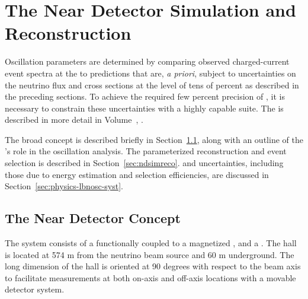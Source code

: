 \section{The Near Detector Simulation and Reconstruction}\label{sec:nu-osc-06}\label{sec:physics-lbnosc-ND}



Oscillation parameters are determined by comparing observed charged-current event spectra at the  to predictions that are, {\em a priori}, subject to uncertainties on the neutrino flux and cross sections at the level of tens of percent as described in the preceding sections. To achieve the required few percent precision of , it is necessary to constrain these uncertainties with a highly capable  suite. The  is described in more detail in Volume~\volnumberexec{}, \voltitleexec{}.

The broad  concept is described briefly in Section~\ref{sec:ndconcept}, along with an outline of the 's role in the oscillation analysis. The parameterized reconstruction and event selection is described in Section~\ref{sec:ndsimreco}. %
 and  uncertainties, including those due to energy estimation and selection efficiencies, are discussed in Section~\ref{sec:physics-lbnosc-syst}.  

\subsection{The Near Detector Concept}
\label{sec:ndconcept}

The   system consists of a  functionally coupled to a magnetized , and a 
. 
The  hall is located at  574 m from the neutrino beam source and 60 m underground. The long dimension of the hall is oriented at 90 degrees with respect to the beam axis to facilitate measurements at both on-axis and off-axis locations with a movable detector system. 

